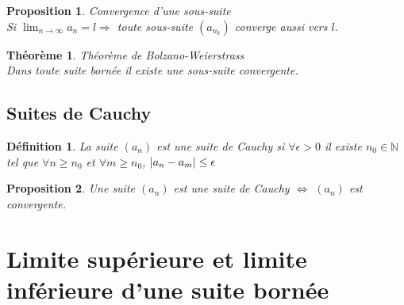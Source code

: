 \documentclass[10pt,a4paper]{book}
\newcommand{\N}{\mathbb{N}}
\DeclarePairedDelimiter\abs{\lvert}{\rvert}
\newtheorem{theorem}{Théorème}[section]
\newtheorem{definition}{Définition}[section]
\newtheorem{proposition}{Proposition}[section]
\begin{document}
\begin{proposition} Convergence d'une sous-suite \\
Si $\lim_{n\rightarrow \infty}a_n = l \Rightarrow$ toute sous-suite $(a_{n_k})$ converge aussi vers $l$.
\end{proposition}
\begin{theorem} Théorème de Bolzano-Weierstrass \\
Dans toute suite bornée il existe une sous-suite convergente.
\end{theorem}

\subsection{Suites de Cauchy}

\begin{definition}
La suite $(a_n)$ est une suite de Cauchy si $\forall \epsilon > 0$ il existe $n_0\in \N$ tel que $\forall n\geq n_0$ et $\forall m\geq n_0$, $\abs{a_n - a_m} \leq \epsilon$
\end{definition}
\begin{proposition}
Une suite $(a_n)$ est une suite de Cauchy $\Leftrightarrow$ $(a_n)$ est convergente.
\end{proposition}

\section{Limite supérieure et limite inférieure d'une suite bornée}
\end{document}
